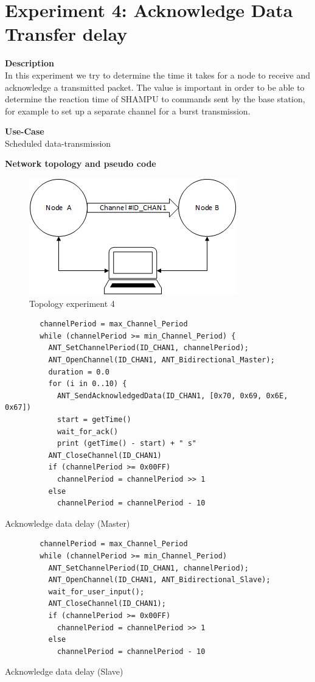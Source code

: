 \section{Experiment 4: Acknowledge Data Transfer delay}
\begin{description} 
	\item{\textbf{Description}} \hfill \\ In this experiment we try to determine the time it takes for a node to receive and acknowledge a transmitted packet. The value is important in order to be able to determine the reaction time of SHAMPU to commands sent by the base station, for example to set up a separate channel for a burst transmission.
	\item{\textbf{Use-Case}} \hfill \\ Scheduled data-transmission
	\item{\textbf{Network topology and pseudo code}} \hfill \\ 
	\begin{figure}[H]
		\centering
		\includegraphics[scale=1]{content/images/exp_topo.png}
		\caption{Topology experiment 4}
	\end{figure}
	\begin{code}[H]
		\begin{verbatim}
		channelPeriod = max_Channel_Period
		while (channelPeriod >= min_Channel_Period) {
		  ANT_SetChannelPeriod(ID_CHAN1, channelPeriod);
		  ANT_OpenChannel(ID_CHAN1, ANT_Bidirectional_Master);
		  duration = 0.0
		  for (i in 0..10) {
		    ANT_SendAcknowledgedData(ID_CHAN1, [0x70, 0x69, 0x6E, 0x67])
		    start = getTime()	   
		    wait_for_ack()		
		    print (getTime() - start) + " s"	  
		  ANT_CloseChannel(ID_CHAN1)		
		  if (channelPeriod >= 0x00FF)
		    channelPeriod = channelPeriod >> 1
		  else
		    channelPeriod = channelPeriod - 10
		\end{verbatim}
		\caption{Acknowledge data delay (Master)}\label{lst:mExp4}
	\end{code}
	
	\begin{code}[H]
		\begin{verbatim}
		channelPeriod = max_Channel_Period
		while (channelPeriod >= min_Channel_Period)
		  ANT_SetChannelPeriod(ID_CHAN1, channelPeriod);
		  ANT_OpenChannel(ID_CHAN1, ANT_Bidirectional_Slave);				 
		  wait_for_user_input();
		  ANT_CloseChannel(ID_CHAN1);
		  if (channelPeriod >= 0x00FF)
		    channelPeriod = channelPeriod >> 1
		  else
		    channelPeriod = channelPeriod - 10
		\end{verbatim}
		\caption{Acknowledge data delay (Slave)}\label{lst:sExp4}
	\end{code}
	

\end{description}
